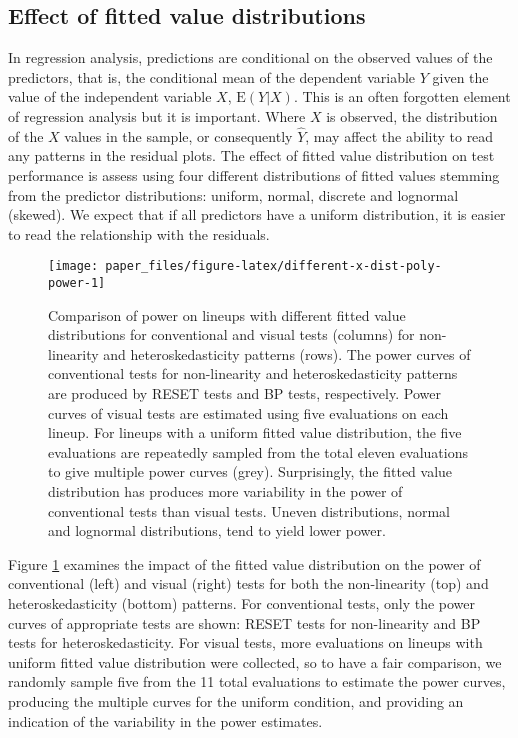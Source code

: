 \documentclass[]{interact}
\theoremstyle{plain}%
\theoremstyle{definition}
\theoremstyle{remark}
\begin{document}
\hypertarget{effect-of-fitted-value-distributions}{%
\subsection{Effect of fitted value
distributions}\label{effect-of-fitted-value-distributions}}

In regression analysis, predictions are conditional on the observed
values of the predictors, that is, the conditional mean of the dependent
variable \(Y\) given the value of the independent variable \(X\),
\(\text{E}(Y|X)\). This is an often forgotten element of regression
analysis but it is important. Where \(X\) is observed, the distribution
of the \(X\) values in the sample, or consequently \(\hat{Y}\), may
affect the ability to read any patterns in the residual plots. The
effect of fitted value distribution on test performance is assess using
four different distributions of fitted values stemming from the
predictor distributions: uniform, normal, discrete and lognormal
(skewed). We expect that if all predictors have a uniform distribution,
it is easier to read the relationship with the residuals.

\begin{figure}[t!]

{\centering \texttt{[image: paper\_files/figure-latex/different-x-dist-poly-power-1]} 

}

\caption{Comparison of power on lineups with different fitted value distributions for conventional and visual tests (columns) for non-linearity and heteroskedasticity patterns (rows). The power curves of conventional tests for non-linearity and heteroskedasticity patterns are produced by RESET tests and BP tests, respectively. Power curves of visual tests are estimated using five evaluations on each lineup. For lineups with a uniform fitted value distribution, the five evaluations are repeatedly sampled from the total eleven evaluations to give multiple power curves (grey). Surprisingly, the fitted value distribution has produces more variability in the power of conventional tests than visual tests. Uneven distributions, normal and lognormal distributions, tend to yield lower power.}\label{fig:different-x-dist-poly-power}
\end{figure}

Figure \ref{fig:different-x-dist-poly-power} examines the impact of the
fitted value distribution on the power of conventional (left) and visual
(right) tests for both the non-linearity (top) and heteroskedasticity
(bottom) patterns. For conventional tests, only the power curves of
appropriate tests are shown: RESET tests for non-linearity and BP tests
for heteroskedasticity. For visual tests, more evaluations on lineups
with uniform fitted value distribution were collected, so to have a fair
comparison, we randomly sample five from the 11 total evaluations to
estimate the power curves, producing the multiple curves for the uniform
condition, and providing an indication of the variability in the power
estimates.
\end{document}
